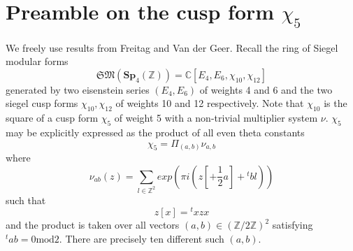 \documentclass[9pt]{amsart} \usepackage[utf8]{inputenc}
\newcommand{\Z}{\mathbb{Z}} \newcommand{\C}{\mathbb{C}}
\newcommand{\R}{\mathbb{R}} \newcommand{\La}{\Lambda}
\newcommand{\Sp}{\mathbf{Sp}}
\newcommand{\Hpl}{\mathcal{H}}
\newcommand{\IV}{\mathbf{IV}}
\newcommand{\fbasis}{(f_i)_{\{1,2,3,-2,-1\}}}
\newcommand{\Id}{\mathbf{I}}
\begin{document}



%
%

\tableofcontents

\section{Preamble on the cusp form $\chi_5$}

We freely use results from Freitag\cite{FREITAG:1} and Van der
Geer\cite{VDGEER:1}. Recall the ring of Siegel modular
forms $$\mathfrak{SM}(\Sp_4(\Z)) = \C[E_4,E_6,\chi_{10},\chi_{12}]$$
generated by two eisenstein series $(E_4,E_6)$ of weights 4 and 6 and
the two siegel cusp forms $\chi_{10},\chi_{12}$ of weights 10 and 12
respectively. Note that $\chi_{10}$ is the square of a cusp form
$\chi_5$ of weight 5 with a non-trivial multiplier system $\nu$.
$\chi_5$ may be explicitly expressed as the product of all even theta
constants $$\chi_5 = \Pi_{(a,b)}\nu_{a,b}$$
where $$\nu_{ab}(z) = \sum_{l\in\Z^2} exp(\pi i (z[ +
\frac{1}{2}a] + {}^tbl))$$ such that $$z[x] = {}^tx z x$$ and the
product is taken over all vectors $(a,b) \in (\Z/2\Z)^2$ satisfying
${}^tab = 0 \textrm{mod} 2$.  There are precisely ten different such
$(a,b)$.
\end{document}
